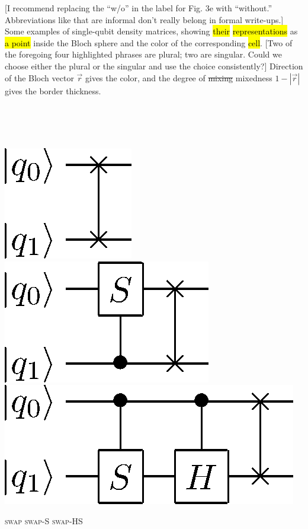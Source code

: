 \documentclass[11pt]{article}
\newcommand{\nicole}[1]{{\color{Green}#1}}
\newenvironment{Figure}{\par\medskip\noindent\minipage{\linewidth}}{\endminipage\par\medskip}
\begin{document}
\begin{multicols}{2}
\begin{Figure}
{{[I recommend replacing the ``w/o'' in  the label for Fig. 3e with ``without.'' Abbreviations like that are informal don't really belong in formal write-ups.]}
Some examples of single-qubit density matrices\nicole{,} showing \hl{their} \hl{representations} as \hl{a point} inside the Bloch sphere and the color of the corresponding \hl{cell}. \nicole{[Two of the foregoing four highlighted phrases are plural; two are singular. Could we choose either the plural or the singular and use the choice consistently?]}
Direction of the Bloch vector $\vec r$ gives the color, and the degree of \sout{mixing} \nicole{mixedness} $1 - |\vec r|$ gives the border thickness.}
\end{Figure}

\hspace{1cm}\\
\hspace{1cm}\\
\hspace{1cm}\\


\begin{Figure}
\centering

\includegraphics[height=0.15\textwidth]{images_caltech/circuits/U2.png}
\hspace{4mm}
\includegraphics[height=0.15\textwidth]{images_caltech/circuits/U2-S.png}
\hspace{4mm}
\includegraphics[height=0.15\textwidth]{images_caltech/circuits/trails.png}

\textsc{swap}\hspace{1cm}
\textsc{swap-S}\hspace{1.5cm}
\textsc{swap-HS}
\vspace{5mm}


\end{Figure}
\end{multicols}
\end{document}
